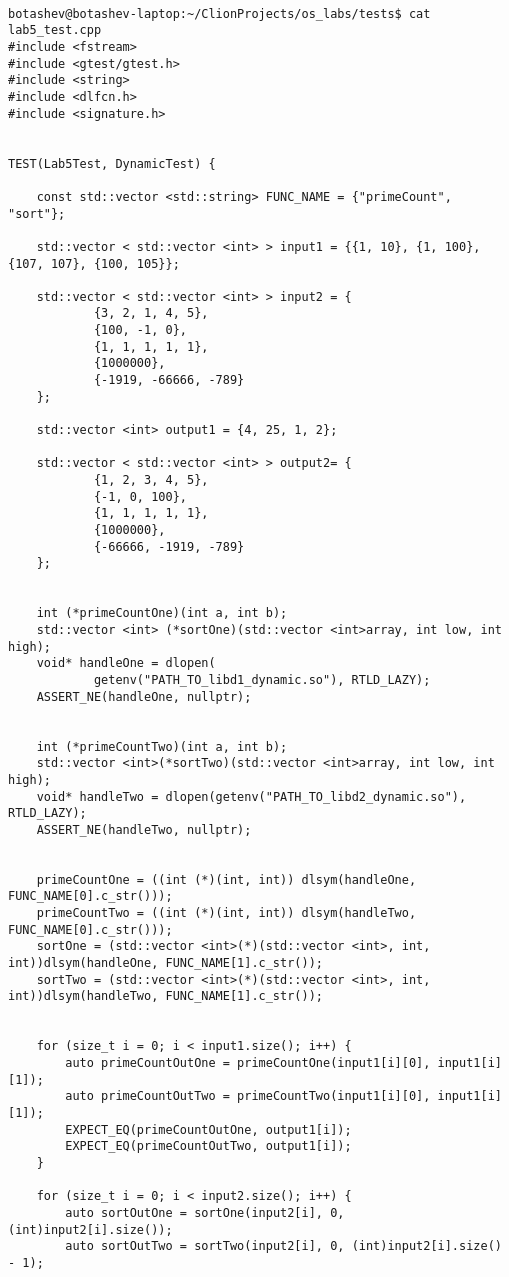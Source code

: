 \documentclass[pdf, unicode, 12pt, a4paper,oneside,fleqn]{article}
\begin{document}
{\scriptsize
\begin{verbatim}

botashev@botashev-laptop:~/ClionProjects/os_labs/tests$ cat lab5_test.cpp
#include <fstream>
#include <gtest/gtest.h>
#include <string>
#include <dlfcn.h>
#include <signature.h>


TEST(Lab5Test, DynamicTest) {

    const std::vector <std::string> FUNC_NAME = {"primeCount", "sort"};

    std::vector < std::vector <int> > input1 = {{1, 10}, {1, 100}, {107, 107}, {100, 105}};

    std::vector < std::vector <int> > input2 = {
            {3, 2, 1, 4, 5},
            {100, -1, 0},
            {1, 1, 1, 1, 1},
            {1000000},
            {-1919, -66666, -789}
    };

    std::vector <int> output1 = {4, 25, 1, 2};

    std::vector < std::vector <int> > output2= {
            {1, 2, 3, 4, 5},
            {-1, 0, 100},
            {1, 1, 1, 1, 1},
            {1000000},
            {-66666, -1919, -789}
    };


    int (*primeCountOne)(int a, int b);
    std::vector <int> (*sortOne)(std::vector <int>array, int low, int high);
    void* handleOne = dlopen(
            getenv("PATH_TO_libd1_dynamic.so"), RTLD_LAZY);
    ASSERT_NE(handleOne, nullptr);


    int (*primeCountTwo)(int a, int b);
    std::vector <int>(*sortTwo)(std::vector <int>array, int low, int high);
    void* handleTwo = dlopen(getenv("PATH_TO_libd2_dynamic.so"), RTLD_LAZY);
    ASSERT_NE(handleTwo, nullptr);


    primeCountOne = ((int (*)(int, int)) dlsym(handleOne, FUNC_NAME[0].c_str()));
    primeCountTwo = ((int (*)(int, int)) dlsym(handleTwo, FUNC_NAME[0].c_str()));
    sortOne = (std::vector <int>(*)(std::vector <int>, int, int))dlsym(handleOne, FUNC_NAME[1].c_str());
    sortTwo = (std::vector <int>(*)(std::vector <int>, int, int))dlsym(handleTwo, FUNC_NAME[1].c_str());


    for (size_t i = 0; i < input1.size(); i++) {
        auto primeCountOutOne = primeCountOne(input1[i][0], input1[i][1]);
        auto primeCountOutTwo = primeCountTwo(input1[i][0], input1[i][1]);
        EXPECT_EQ(primeCountOutOne, output1[i]);
        EXPECT_EQ(primeCountOutTwo, output1[i]);
    }

    for (size_t i = 0; i < input2.size(); i++) {
        auto sortOutOne = sortOne(input2[i], 0, (int)input2[i].size());
        auto sortOutTwo = sortTwo(input2[i], 0, (int)input2[i].size() - 1);



\end{verbatim}}
\end{document}

